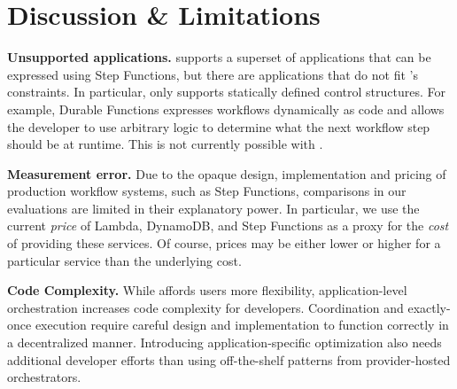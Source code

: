 \section{Discussion \& Limitations}\label{sec:limitations}


\textbf{Unsupported applications.} \name{} supports a superset of
applications that can be expressed using Step Functions, but there are
applications that do not fit \name{}'s constraints. In particular, \name{}
only supports statically defined control structures. For example, Durable
Functions expresses workflows dynamically as code and allows the developer to
use arbitrary logic to determine what the next workflow step should be at
runtime. This is not currently possible with \name{}.\par

\textbf{Measurement error.} Due to the opaque design, implementation and
pricing of production workflow systems, such as Step Functions, comparisons in
our evaluations are limited in their explanatory power. In particular, we use
the current \emph{price} of Lambda, DynamoDB, and Step Functions as a proxy
for the \emph{cost} of providing these services. Of course, prices may be
either lower or higher for a particular service than the underlying cost.

\textbf{Code Complexity.} While \name{} affords users more flexibility,
application-level orchestration increases code complexity for developers.
Coordination and exactly-once execution require careful design and
implementation to function correctly in a decentralized manner. Introducing
application-specific optimization also needs additional developer efforts than
using off-the-shelf patterns from provider-hosted orchestrators.


